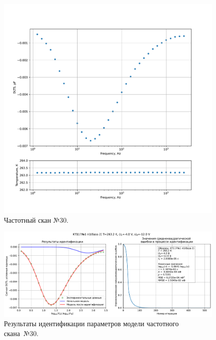 \begin{figure}[!ht]
    \centering
    \includegraphics[width=1\textwidth]{../plots/КТ117№1_п1(база 2)_2500Гц-1Гц_1пФ_-10С_-4В-12В_100мВ_20мкс_шаг_0,1.pdf}
    \caption{Частотный скан №30.}
    \label{pic:frequency_scan_30}
\end{figure}

\begin{figure}[!ht]
    \centering
    \includegraphics[width=1\textwidth]{../plots/КТ117№1_п1(база 2)_2500Гц-1Гц_1пФ_-10С_-4В-12В_100мВ_20мкс_шаг_0,1_model.pdf}
    \caption{Результаты идентификации параметров модели частотного скана~№30.}
    \label{pic:frequency_scan_model30}
\end{figure}

\pagebreak


